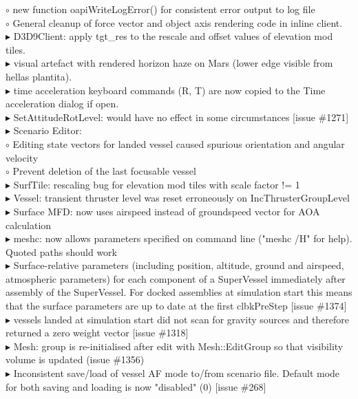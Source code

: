 \documentclass[Orbiter User Manual.tex]{subfiles}
\begin{document}
$\circ$ new function oapiWriteLogError() for consistent error output to log file\\
$\circ$ General cleanup of force vector and object axis rendering code in inline client.\\
$\blacktriangleright$ D3D9Client: apply tgt\_res to the rescale and offset values of elevation mod tiles.\\
$\blacktriangleright$ visual artefact with rendered horizon haze on Mars (lower edge visible from hellas plantita).\\
$\blacktriangleright$ time acceleration keyboard commands (R, T) are now copied to the Time acceleration dialog if open.\\
$\blacktriangleright$ SetAttitudeRotLevel: would have no effect in some circumstances [issue \#1271]\\
$\blacktriangleright$ Scenario Editor:\\
$\circ$ Editing state vectors for landed vessel caused spurious orientation and angular velocity\\
$\circ$ Prevent deletion of the last focusable vessel\\
$\blacktriangleright$ SurfTile: rescaling bug for elevation mod tiles with scale factor != 1\\
$\blacktriangleright$ Vessel: transient thruster level was reset erroneously on IncThrusterGroupLevel\\
$\blacktriangleright$ Surface MFD: now uses airspeed instead of groundspeed vector for AOA calculation\\
$\blacktriangleright$ meshc: now allows parameters specified on command line ("meshc /H" for help). Quoted paths should work\\
$\blacktriangleright$ Surface-relative parameters (including position, altitude, ground and airspeed, atmospheric parameters) for each component of a SuperVessel immediately after assembly of the SuperVessel. For docked assemblies at simulation start this means that the surface parameters are up to date at the first clbkPreStep [issue \#1374]\\
$\blacktriangleright$ vessels landed at simulation start did not scan for gravity sources and therefore returned a zero weight vector [issue \#1318]\\
$\blacktriangleright$ Mesh: group is re-initialised after edit with Mesh::EditGroup so that visibility volume is updated (issue \#1356)\\
$\blacktriangleright$ Inconsistent save/load of vessel AF mode to/from scenario file. Default mode for both saving and loading is now "disabled" (0) [issue \#268]\\
\end{document}
